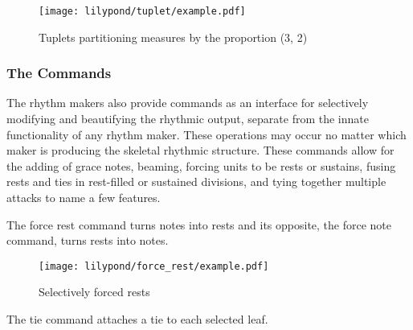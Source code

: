 \begin{figure}[H]
    \texttt{[image: lilypond/tuplet/example.pdf]}
    \caption{Tuplets partitioning measures by the proportion (3, 2)}
    \label{fig:tupletstackresult}
\end{figure}

\subsubsection{The Commands}

The rhythm makers also provide commands as an interface for selectively modifying and beautifying the rhythmic output, separate from the innate functionality of any rhythm maker. These operations may occur no matter which maker is producing the skeletal rhythmic structure. These commands allow for the adding of grace notes, beaming, forcing units to be rests or sustains, fusing rests and ties in rest-filled or sustained divisions, and tying together multiple attacks to name a few features.

The force rest command turns notes into rests and its opposite, the force note command, turns rests into notes.


\begin{figure}[H]
    \texttt{[image: lilypond/force\_rest/example.pdf]}
    \caption{Selectively forced rests}
    \label{fig:forcerest}
\end{figure}

The tie command attaches a tie to each selected leaf.


